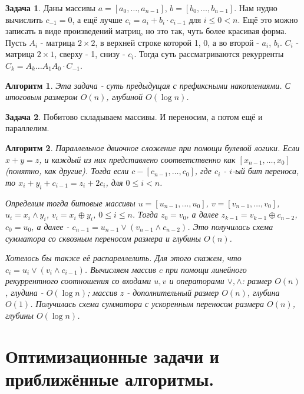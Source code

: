 \documentclass[a4paper]{article}
\theoremstyle{indented}
\newtheorem{alg}{Алгоритм}
\theoremstyle{definition}
\newtheorem{prob}{Задача}
\theoremstyle{remark}
\begin{document}
\begin{prob}
    Даны массивы $a=[a_0, \ldots, a_{n-1}]$, $b=[b_0, \ldots, b_{n-1}]$. Нам нудно вычислить $c_{-1}=0$, а ещё лучше $c_i=a_i+b_i\cdot c_{i-1}$ для $i\leq 0 < n$. Ещё это можно записать в виде произведений матриц, но это так, чуть более красивая форма. Пусть $A_i$ - матрица $2 \times 2$, в верхней строке которой 1, 0, а во второй - $a_i$, $b_i$. $C_i$ - матрица $2 \times 1$, сверху - 1, снизу - $c_i$. Тогда суть рассматриваются рекурренты $C_k=A_k\ldots A_1A_0\cdot C_{-1}$. 
\end{prob}

\begin{alg}
    Эта задача - суть предыдущая с префиксными накоплениями. С итоговым размером $O(n)$, глубиной $O(\log n)$. 
\end{alg}

\begin{prob}
    Побитово складываем массивы. И переносим, а потом ещё и параллелим.
\end{prob}

\begin{alg}
    Параллельное \textit{двиочное сложение} при помощи булевой логики. Если $x+y = z$, и каждый из них представлено соответственно как $[x_{n-1}, \ldots, x_0]$ (понятно, как другие). Тогда если $c - [c_{n-1}, \ldots, c_0]$, где $c_i$ - $i$-ый бит переноса, то $x_i+y_i + c_{i-1} = z_i + 2c_i$, для $0 \leq i < n$. \ 

    Определим тогда битовые массивы $u = [u_{n-1}, \ldots, u_0]$, $v = [v_{n-1}, \ldots, v_0]$, $u_i = x_i \wedge y_i$, $v_i = x_i \oplus y_i$, $0 \leq i \leq n$. Тогда $z_0 = v_0$, а далее $z_{k-1} = v_{k-1} \oplus c_{n-2}$, $c_0 = u_0$, а далее - $c_{n-1} = u_{n-1} \vee (v_{n-1} \wedge c_{n-2})$. Это получилась схема \textit{сумматора со сквозным переносом} размера и глубины $O(n)$. \ 

    Хотелось бы также её распареллелить. Для этого скажем, что $c_i = u_i \vee (v_i \wedge c_{i-1})$. Вычисляем массив $c$ при помощи линейного рекуррентного соотношения со входами $u, v$ и операторами $\vee, \wedge$: размер $O(n)$, глудина - $O(\log n)$; массив $z$ - дополнительный размер $O(n)$, глубина $O(1)$. Получилась схема \textit{сумматора с ускоренным переносом} размера $O(n)$, глубины $O(\log n)$. 
\end{alg}

\section{Оптимизационные задачи и приближённые алгоритмы.}
\end{document}
